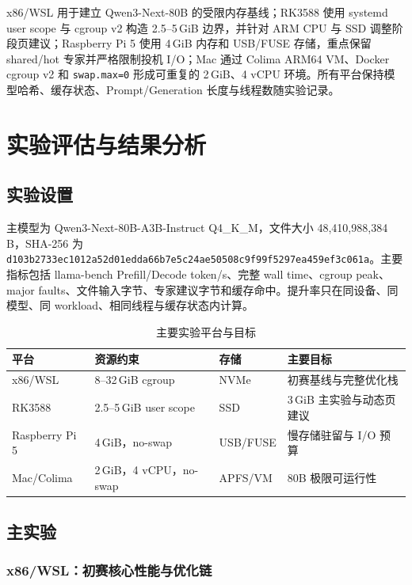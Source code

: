 \documentclass[a4paper]{article}
\begin{document}
x86/WSL 用于建立 Qwen3-Next-80B 的受限内存基线；RK3588 使用 systemd user scope 与 cgroup v2 构造 2.5--5\,GiB 边界，并针对 ARM CPU 与 SSD 调整阶段页建议；Raspberry Pi 5 使用 4\,GiB 内存和 USB/FUSE 存储，重点保留 shared/hot 专家并严格限制投机 I/O；Mac 通过 Colima ARM64 VM、Docker cgroup v2 和 \texttt{swap.max=0} 形成可重复的 2\,GiB、4 vCPU 环境。所有平台保持模型哈希、缓存状态、Prompt/Generation 长度与线程数随实验记录。

\newpage
\section{实验评估与结果分析}

\subsection{实验设置}

主模型为 Qwen3-Next-80B-A3B-Instruct Q4\_K\_M，文件大小 48,410,988,384\,B，SHA-256 为 \texttt{d103b2733ec1012a52d01edda66b7e5c24ae50508c9f99f5297ea459ef3c061a}。主要指标包括 llama-bench Prefill/Decode token/s、完整 wall time、cgroup peak、major faults、文件输入字节、专家建议字节和缓存命中。提升率只在同设备、同模型、同 workload、相同线程与缓存状态内计算。

\begin{table}[H]
\centering
\small
\caption{主要实验平台与目标}
\begin{tabular}{llll}
\toprule
平台 & 资源约束 & 存储 & 主要目标 \\
\midrule
x86/WSL & 8--32\,GiB cgroup & NVMe & 初赛基线与完整优化栈 \\
RK3588 & 2.5--5\,GiB user scope & SSD & 3\,GiB 主实验与动态页建议 \\
Raspberry Pi 5 & 4\,GiB，no-swap & USB/FUSE & 慢存储驻留与 I/O 预算 \\
Mac/Colima & 2\,GiB，4 vCPU，no-swap & APFS/VM & 80B 极限可运行性 \\
\bottomrule
\end{tabular}
\end{table}

\subsection{主实验}

\subsubsection{x86/WSL：初赛核心性能与优化链}
\end{document}
